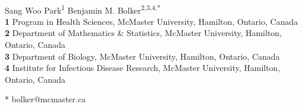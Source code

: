 \documentclass[10pt,letterpaper]{article}
\date{}
\begin{document}
\vspace*{0.2in}

\begin{flushleft}
{\Large
\textbf{} %
}
\newline
\\
Sang Woo Park\textsuperscript{1}
Benjamin M. Bolker\textsuperscript{2,3,4,*}
\\
\bigskip
\textbf{1} Program in Health Sciences, McMaster University, Hamilton, Ontario, Canada
\\
\textbf{2} Department of Mathematics \& Statistics,  McMaster University, Hamilton, Ontario, Canada
\\
\textbf{3} Department of Biology,  McMaster University, Hamilton, Ontario, Canada
\\
\textbf{4} Institute for Infectious Disease Research,  McMaster University, Hamilton, Ontario, Canada
\\
\bigskip

% 
%





* bolker@mcmaster.ca

\end{flushleft}
\end{document}
